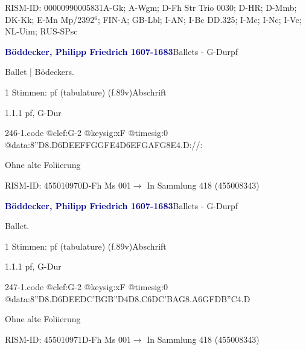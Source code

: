 \documentclass[twocolumn]{book}
\begin{document}
\par RISM-ID: 00000990005831\newline A-Gk; A-Wgm; D-Fh  Str Trio 0030; D-HR; D-Mmb; DK-Kk; E-Mn  Mp/2392$^6$; FIN-A; GB-Lbl; I-AN; I-Bc  DD.325; I-Mc; I-Nc; I-Vc; NL-Uim; RUS-SPsc
\par \vspace{7pt} \textcolor{darkblue}{\textbf{Böddecker, Philipp Friedrich  1607-1683}}\hfillplus{\textbf{[246]}}\newline Ballets - G-Dur\newline pf
\par \begin{itshape}[f.89v, at left:] Ballet | Bödeckers.\end{itshape} 
\par \textcolor{darkblue}{}  1 Stimmen: pf (tabulature)  (f.89v)\newline Abschrift
\par 1.1.1  pf, G-Dur  
\begin{filecontents*}{246-1.code}
@clef:G-2
@keysig:xF
@timesig:0
@data:8''D{8.D6D}{EEFF}{GGFE}4D{6EFGA}{FG8E}4.D://:
\end{filecontents*}
\newline
%
\par Ohne alte Foliierung
\par RISM-ID: 455010970\newline D-Fh  Ms 001\newline $\rightarrow$ In Sammlung 418 (455008343)
      
\par \vspace{7pt} \textcolor{darkblue}{\textbf{Böddecker, Philipp Friedrich  1607-1683}}\hfillplus{\textbf{[247]}}\newline Ballets - G-Dur\newline pf
\par \begin{itshape}[f.89v, at left:] Ballet.\end{itshape} 
\par \textcolor{darkblue}{}  1 Stimmen: pf (tabulature)  (f.89v)\newline Abschrift
\par 1.1.1  pf, G-Dur  
\begin{filecontents*}{247-1.code}
@clef:G-2
@keysig:xF
@timesig:0
@data:8''D{8.D6D}{EEDC}{'BGB''D}4D{8.C6D}{C'BAG}{8.A6G}{FDB''C}4.D
\end{filecontents*}
\newline
%
\par Ohne alte Foliierung
\par RISM-ID: 455010971\newline D-Fh  Ms 001\newline $\rightarrow$ In Sammlung 418 (455008343)
      
\end{document}
